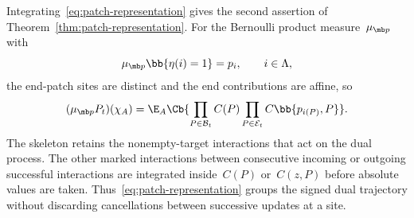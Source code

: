 Integrating~\eqref{eq:patch-representation} gives the second assertion of
Theorem~\ref{thm:patch-representation}. For the Bernoulli product
measure~$\mu_{\mb p}$ with
\begin{equation*}
\mu_{\mb p}\bb{\eta(i)=1}=p_i,
\qquad i\in\Lambda,
\end{equation*}
the end-patch sites are distinct and the end contributions are affine, so
\begin{equation}
\label{eq:patch-representation-product-law}
(\mu_{\mb p}P_t)(\chi_A)
=
\E_A\Cb{
\prod_{P\in\mathcal B_t}C(P)
\prod_{P\in\mathcal E_t}C\bb{p_{i(P)},P}
}.
\end{equation}
The skeleton retains the nonempty-target interactions that act on the dual
process. The other marked interactions between consecutive incoming or
outgoing successful interactions are integrated inside~$C(P)$ or~$C(z,P)$
before absolute values are taken. Thus~\eqref{eq:patch-representation} groups
the signed dual trajectory without discarding cancellations between successive
updates at a site.

\FloatBarrier
